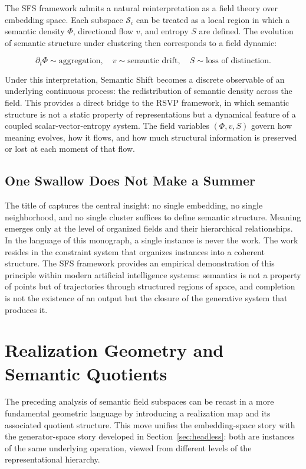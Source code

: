 \documentclass[11pt, twoside]{article}
\theoremstyle{plain}
\theoremstyle{definition}
\theoremstyle{remark}
\begin{document}
The SFS framework admits a natural reinterpretation as a field theory over embedding space. Each subspace $\mathcal{S}_i$ can be treated as a local region in which a semantic density $\Phi$, directional flow $v$, and entropy $S$ are defined. The evolution of semantic structure under clustering then corresponds to a field dynamic:

\[
\partial_t \Phi \sim \text{aggregation}, \quad v \sim \text{semantic drift}, \quad S \sim \text{loss of distinction}.
\]

Under this interpretation, Semantic Shift becomes a discrete observable of an underlying continuous process: the redistribution of semantic density across the field. This provides a direct bridge to the RSVP framework, in which semantic structure is not a static property of representations but a dynamical feature of a coupled scalar-vector-entropy system. The field variables $(\Phi, v, S)$ govern how meaning evolves, how it flows, and how much structural information is preserved or lost at each moment of that flow.

\subsection{One Swallow Does Not Make a Summer}

The title of \cite{sun2025swallow} captures the central insight: no single embedding, no single neighborhood, and no single cluster suffices to define semantic structure. Meaning emerges only at the level of organized fields and their hierarchical relationships. In the language of this monograph, a single instance is never the work. The work resides in the constraint system that organizes instances into a coherent structure. The SFS framework provides an empirical demonstration of this principle within modern artificial intelligence systems: semantics is not a property of points but of trajectories through structured regions of space, and completion is not the existence of an output but the closure of the generative system that produces it.

\section{Realization Geometry and Semantic Quotients}
\label{sec:realization_semantics}

The preceding analysis of semantic field subspaces can be recast in a more fundamental geometric language by introducing a realization map and its associated quotient structure. This move unifies the embedding-space story with the generator-space story developed in Section~\ref{sec:headless}: both are instances of the same underlying operation, viewed from different levels of the representational hierarchy.
\end{document}
